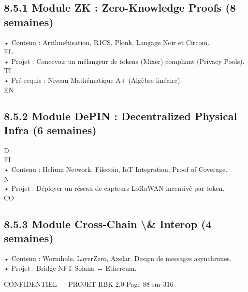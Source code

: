 \subsection{8.5.1 Module ZK : Zero-Knowledge Proofs (8 semaines)}
• Contenu : Arithmétisation, R1CS, Plonk, Langage Noir et Circom.\\
\vspace{0.5em}
\vspace{0.5em}
\vspace{0.5em}
\vspace{0.5em}
EL\\
• Projet : Concevoir un mélangeur de tokens (Mixer) compliant (Privacy Pools).\\
\vspace{0.5em}
\vspace{0.5em}
\vspace{0.5em}
\vspace{0.5em}
TI\\
• Pré-requis : Niveau Mathématique A+ (Algèbre linéaire).\\
\vspace{0.5em}
\vspace{0.5em}
\vspace{0.5em}
\vspace{0.5em}
EN\\
\subsection{8.5.2 Module DePIN : Decentralized Physical Infra (6 semaines)}
\vspace{0.5em}
\vspace{0.5em}
\vspace{0.5em}
\vspace{0.5em}
D\\
FI\\
• Contenu : Helium Network, Filecoin, IoT Integration, Proof of Coverage.\\
\vspace{0.5em}
\vspace{0.5em}
N\\
• Projet : Déployer un réseau de capteurs LoRaWAN incentivé par token.\\
CO\\
\subsection{8.5.3 Module Cross-Chain \textbackslash{}& Interop (4 semaines)}
• Contenu : Wormhole, LayerZero, Axelar. Design de messages asynchrones.\\
\vspace{0.5em}
• Projet : Bridge NFT Solana ↔ Ethereum.\\
\vspace{0.5em}
\vspace{0.5em}
\vspace{0.5em}
\vspace{0.5em}
\begin{confidential}CONFIDENTIEL — PROJET RBK 2.0                               Page 88 sur 316\end{confidential}
